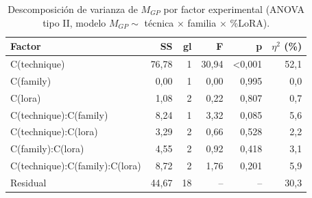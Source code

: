 \begin{table}[H]
\centering\footnotesize
\caption{Descomposición de varianza de $M_{GP}$ por factor experimental (ANOVA tipo II, modelo $M_{GP}\sim$ técnica $\times$ familia $\times$ \%LoRA).}
\label{tab:ex_factores_anova}
\begin{tabular}{@{}lrrrrr@{}}
\toprule
\textbf{Factor} & \textbf{SS} & \textbf{gl} & \textbf{F} & \textbf{p} & \textbf{$\eta^2$ (\%)} \\
\midrule
C(technique) & 76,78 & 1 & 30,94 & \textless 0,001 & 52,1 \\
C(family) & 0,00 & 1 & 0,00 & 0,995 & 0,0 \\
C(lora) & 1,08 & 2 & 0,22 & 0,807 & 0,7 \\
C(technique):C(family) & 8,24 & 1 & 3,32 & 0,085 & 5,6 \\
C(technique):C(lora) & 3,29 & 2 & 0,66 & 0,528 & 2,2 \\
C(family):C(lora) & 4,55 & 2 & 0,92 & 0,418 & 3,1 \\
C(technique):C(family):C(lora) & 8,72 & 2 & 1,76 & 0,201 & 5,9 \\
Residual & 44,67 & 18 & -- & -- & 30,3 \\
\bottomrule
\end{tabular}
\end{table}